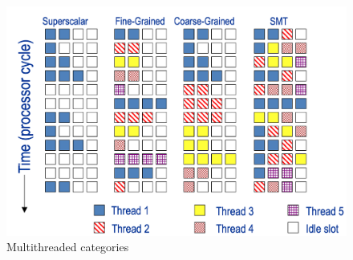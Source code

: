 \begin{figure}
    \centering
    \includegraphics{images/multithreaded-categories}
    \caption{Multithreaded categories}
    \label{fig:multithreaded-categories}
\end{figure}



